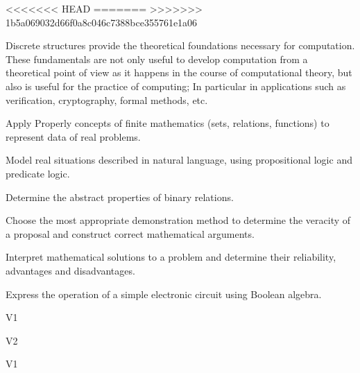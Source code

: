 \begin{syllabus}

<<<<<<< HEAD
=======
>>>>>>> 1b5a069032d66f0a8c046c7388bce355761e1a06

\begin{justification}

Discrete structures provide the theoretical foundations necessary for computation. These fundamentals are not only useful to develop computation from a theoretical point of view as it happens 
in the course of computational theory, but also is useful for the practice of computing; In particular in applications such as verification,
cryptography, formal methods, etc.

\end{justification}

\begin{goals}
\item Apply Properly concepts of finite mathematics (sets, relations, functions) to represent data of real problems.
\item Model real situations described in natural language, using propositional logic and predicate logic.
\item Determine the abstract properties of binary relations.
\item Choose the most appropriate demonstration method to determine the veracity of a proposal and construct correct mathematical arguments.
\item Interpret mathematical solutions to a problem and determine their reliability, advantages and disadvantages.
\item Express the operation of a simple electronic circuit using Boolean algebra.
\end{goals}

\begin{outcomes}{V1}
    \item {}
    \item {}
\end{outcomes}

\begin{outcomes}{V2}
    \item {}
    \item {}
\end{outcomes}

\begin{competences}{V1}
    \item {}
    \item {}
\end{competences}


\end{syllabus}
